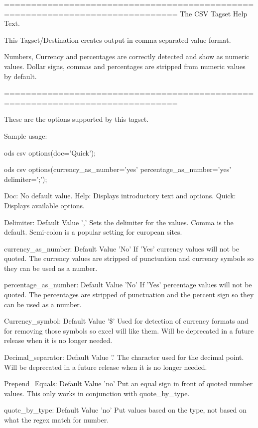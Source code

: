 \begin{sfvoutput}
==============================================================================
The CSV Tagset Help Text.
 
This Tagset/Destination creates output in comma separated value format.
 
Numbers, Currency and percentages are correctly detected and show as numeric values.
Dollar signs, commas and percentages are stripped from numeric values by default.
 
==============================================================================
 
These are the options supported by this tagset.
 
Sample usage:
 
ods csv options(doc='Quick'); 
 
ods csv options(currency_as_number='yes' percentage_as_number='yes' delimiter=';'); 
 
Doc:  No default value.
     Help: Displays introductory text and options.
     Quick: Displays available options.
 
Delimiter:   Default Value ','
     Sets the delimiter for the values.  Comma is the default.  Semi-colon is
     a popular setting for european sites.
 
currency_as_number:   Default Value 'No'
     If 'Yes' currency values will not be quoted.
     The currency values are stripped of punctuation and currency symbols
     so they can be used as a number.
 
percentage\_as\_number:   Default Value 'No'
     If 'Yes' percentage values will not be quoted.
     The percentages are stripped of punctuation and the percent sign
     so they can be used as a number.
 
Currency\_symbol:   Default Value '\$'
     Used for detection of currency formats and for 
     removing those symbols so excel will like them.
     Will be deprecated in a future release when it is
     no longer needed.        
 
Decimal\_separator:   Default Value '.'
     The character used for the decimal point.
     Will be deprecated in a future release when it is no longer needed.
 
Prepend\_Equals:   Default Value 'no'
     Put an equal sign in front of quoted number values.
     This only works in conjunction with quote_by_type.
 
quote\_by\_type:   Default Value 'no'
     Put values based on the type, not based on what the regex match for number.
 

\end{sfvoutput}
